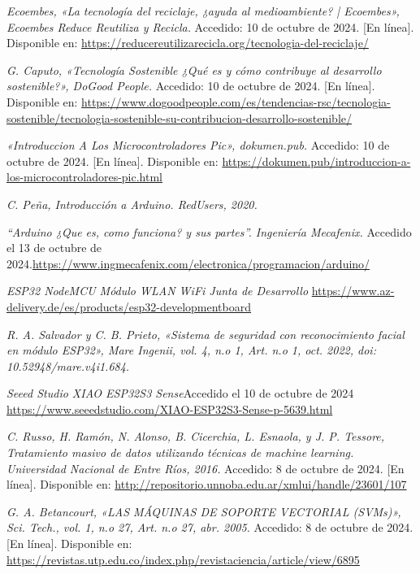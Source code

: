 \begin{thebibliography}{99}

    \textit{Ecoembes, «La tecnología del reciclaje, ¿ayuda al medioambiente? | Ecoembes», Ecoembes Reduce Reutiliza y Recicla.} Accedido: 10 de octubre de 2024. [En línea]. Disponible en: \url{https://reducereutilizarecicla.org/tecnologia-del-reciclaje/}
    
    \textit{G. Caputo, «Tecnología Sostenible ¿Qué es y cómo contribuye al desarrollo sostenible?», DoGood People.} Accedido: 10 de octubre de 2024. [En línea]. Disponible en: \url{https://www.dogoodpeople.com/es/tendencias-rsc/tecnologia-sostenible/tecnologia-sostenible-su-contribucion-desarrollo-sostenible/}
    
    \textit{«Introduccion A Los Microcontroladores Pic», dokumen.pub.} Accedido: 10 de octubre de 2024. [En línea]. Disponible en: \url{https://dokumen.pub/introduccion-a-los-microcontroladores-pic.html}
    
    \textit{C. Peña, Introducción a Arduino. RedUsers, 2020.}

    \textit{“Arduino ¿Que es, como funciona? y sus partes”. Ingeniería Mecafenix.} Accedido el 13 de octubre de 2024.\url{https://www.ingmecafenix.com/electronica/programacion/arduino/}

    \textit{ESP32 NodeMCU Módulo WLAN WiFi Junta de Desarrollo} \url{https://www.az-delivery.de/es/products/esp32-developmentboard}
    
    \textit{R. A. Salvador y C. B. Prieto, «Sistema de seguridad con reconocimiento facial en módulo ESP32», Mare Ingenii, vol. 4, n.o 1, Art. n.o 1, oct. 2022, doi: 10.52948/mare.v4i1.684.}

    \textit{Seeed Studio XIAO ESP32S3 Sense}Accedido el 10 de octubre de 2024 \url{https://www.seeedstudio.com/XIAO-ESP32S3-Sense-p-5639.html}
    
    \textit{C. Russo, H. Ramón, N. Alonso, B. Cicerchia, L. Esnaola, y J. P. Tessore, Tratamiento masivo de datos utilizando técnicas de machine learning. Universidad Nacional de Entre Ríos, 2016.} Accedido: 8 de octubre de 2024. [En línea]. Disponible en: \url{http://repositorio.unnoba.edu.ar/xmlui/handle/23601/107}
    
    \textit{G. A. Betancourt, «LAS MÁQUINAS DE SOPORTE VECTORIAL (SVMs)», Sci. Tech., vol. 1, n.o 27, Art. n.o 27, abr. 2005.} Accedido: 8 de octubre de 2024. [En línea]. Disponible en: \url{https://revistas.utp.edu.co/index.php/revistaciencia/article/view/6895}


\end{thebibliography}
